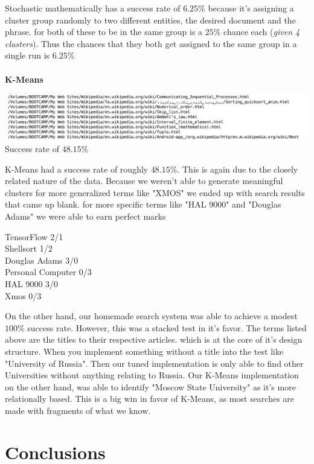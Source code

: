 \documentclass{article}
\begin{document}
Stochastic mathematically has a success rate of $6.25\%$ because it's assigning a cluster group randomly to two different entities, the desired document and the phrase. for both of these to be in the same group is a $25\%$ chance each (\textit{given 4 clusters}). Thus the chances that they both get assigned to the same group in a single run is $6.25\%$
\\\\
\noindent
\textbf{K-Means}
\begin{center}
\includegraphics[scale=0.4]{Kmeans.png}\\
Success rate of $48.15\%$
\end{center}
K-Means had a success rate of roughly $48.15\%$. This is again due to the closely related nature of the data. Because we weren't able to generate meaningful clusters for more generalized terms like "XMOS" we ended up with search results that came up blank. for more specific terms like "HAL 9000" and "Douglas Adams" we were able to earn perfect marks

\begin{center}
    TensorFlow 2/1 \\
Shellsort 1/2 \\
Douglas Adams 3/0 \\
Personal Computer 0/3 \\
HAL 9000 3/0 \\
Xmos 0/3 \\
\end{center}

On the other hand, our homemade search system was able to achieve a modest $100\%$ success rate. However, this was a stacked test in it's favor. The terms listed above are the titles to their respective articles. which is at the core of it's design structure. When you implement something without a title into the test like "University of Russia". Then our tuned implementation is only able to find other Universities without anything relating to Russia. Our K-Means implementation on the other hand, was able to identify "Moscow State University" as it's more relationally based. This is a big win in favor of K-Means, as most searches are made with fragments of what we know. 

\section{Conclusions}
\end{document}
